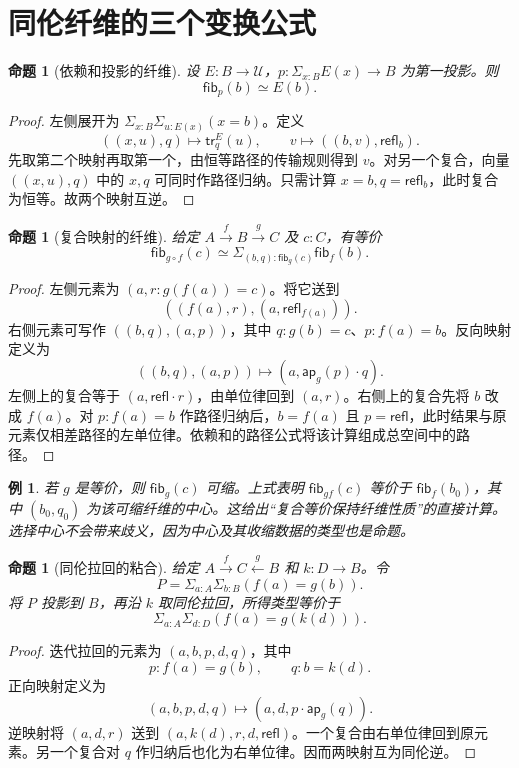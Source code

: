 \documentclass[12pt,oneside,openany,fontset=none]{ctexbook}
\theoremstyle{cn}
\newtheorem{example}[definition]{例}
\newtheorem{proposition}[definition]{命题}
\numberwithin{equation}{chapter}
\newcommand{\U}{\mathcal U}
\newcommand{\refl}{\mathsf{refl}}
\newcommand{\ap}{\mathsf{ap}}
\newcommand{\tr}{\mathsf{tr}}
\newcommand{\fib}{\mathsf{fib}}
\begin{document}
\section{同伦纤维的三个变换公式}

\begin{proposition}[依赖和投影的纤维]
设 $E:B\to\U$，$p:\Sigma_{x:B}E(x)\to B$ 为第一投影。则
\[
 \fib_p(b)\simeq E(b).
\]
\end{proposition}
\begin{proof}
左侧展开为 $\Sigma_{x:B}\Sigma_{u:E(x)}(x=b)$。定义
\[
 ((x,u),q)\longmapsto\tr^E_q(u),
 \qquad
 v\longmapsto((b,v),\refl_b).
\]
先取第二个映射再取第一个，由恒等路径的传输规则得到 $v$。对另一个复合，向量 $((x,u),q)$ 中的 $x,q$ 可同时作路径归纳。只需计算 $x=b,q=\refl_b$，此时复合为恒等。故两个映射互逆。
\end{proof}

\begin{proposition}[复合映射的纤维]\label{prop:composite-fiber}
给定 $A\xrightarrow f B\xrightarrow g C$ 及 $c:C$，有等价
\[
 \fib_{g\circ f}(c)
 \simeq
 \Sigma_{(b,q):\fib_g(c)}\fib_f(b).
\]
\end{proposition}
\begin{proof}
左侧元素为 $(a,r:g(f(a))=c)$。将它送到
\[
 ((f(a),r),(a,\refl_{f(a)})).
\]
右侧元素可写作 $((b,q),(a,p))$，其中 $q:g(b)=c$、$p:f(a)=b$。反向映射定义为
\[
 ((b,q),(a,p))\longmapsto
 (a,\ap_g(p)\cdot q).
\]
左侧上的复合等于 $(a,\refl\cdot r)$，由单位律回到 $(a,r)$。右侧上的复合先将 $b$ 改成 $f(a)$。对 $p:f(a)=b$ 作路径归纳后，$b=f(a)$ 且 $p=\refl$，此时结果与原元素仅相差路径的左单位律。依赖和的路径公式将该计算组成总空间中的路径。
\end{proof}

\begin{example}
若 $g$ 是等价，则 $\fib_g(c)$ 可缩。上式表明 $\fib_{gf}(c)$ 等价于 $\fib_f(b_0)$，其中 $(b_0,q_0)$ 为该可缩纤维的中心。这给出“复合等价保持纤维性质”的直接计算。选择中心不会带来歧义，因为中心及其收缩数据的类型也是命题。
\end{example}

\begin{proposition}[同伦拉回的粘合]
给定 $A\xrightarrow f C\xleftarrow g B$ 和 $k:D\to B$。令
\[
 P=\Sigma_{a:A}\Sigma_{b:B}(f(a)=g(b)).
\]
将 $P$ 投影到 $B$，再沿 $k$ 取同伦拉回，所得类型等价于
\[
 \Sigma_{a:A}\Sigma_{d:D}(f(a)=g(k(d))).
\]
\end{proposition}
\begin{proof}
迭代拉回的元素为 $(a,b,p,d,q)$，其中
\[
 p:f(a)=g(b),\qquad q:b=k(d).
\]
正向映射定义为
\[
 (a,b,p,d,q)\longmapsto(a,d,p\cdot\ap_g(q)).
\]
逆映射将 $(a,d,r)$ 送到 $(a,k(d),r,d,\refl)$。一个复合由右单位律回到原元素。另一个复合对 $q$ 作归纳后也化为右单位律。因而两映射互为同伦逆。
\end{proof}
\end{document}
